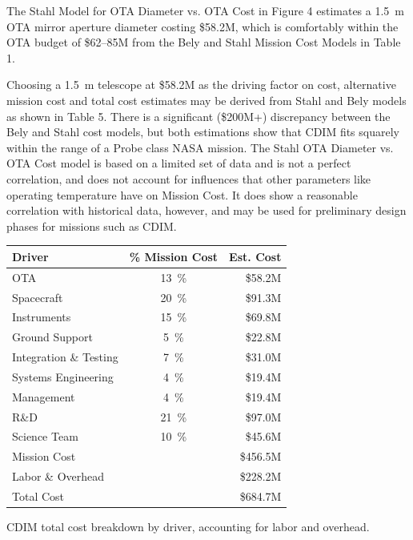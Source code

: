 \documentclass{ws-jai}
\newenvironment{notes}{\color{red}}{}
\begin{document}
\begin{notes}
The Stahl Model for OTA Diameter vs. OTA Cost in Figure 4 estimates a \SI{1.5}{\meter} OTA mirror aperture diameter costing \$58.2M, which is comfortably within the OTA budget of \$62--85M from the Bely and Stahl Mission Cost Models in Table 1.

Choosing a \SI{1.5}{\meter} telescope at \$58.2M as the driving factor on cost, alternative mission cost and total cost estimates may be derived from Stahl and Bely models as shown in Table 5.
There is a significant (\$200M+) discrepancy between the Bely and Stahl cost models, but both estimations show that CDIM fits squarely within the range of a Probe class NASA mission.
The Stahl OTA Diameter vs. OTA Cost model is based on a limited set of data and is not a perfect correlation, and does not account for influences that other parameters like operating temperature have on Mission Cost.
It does show a reasonable correlation with historical data, however, and may be used for preliminary design phases for missions such as CDIM.\@
\end{notes}
\begin{wstable}
  \centering
  \begin{tabular}{@{}lcr@{}}\toprule
    Driver                & \% Mission Cost & Est. Cost \\ \midrule
    OTA                   & \SI{13}{\percent} & \$58.2M \\
    Spacecraft            & \SI{20}{\percent} & \$91.3M \\
    Instruments           & \SI{15}{\percent} & \$69.8M \\
    Ground Support        & \SI{5}{\percent}  & \$22.8M \\
    Integration \& Testing & \SI{7}{\percent} & \$31.0M \\
    Systems Engineering   & \SI{4}{\percent}  & \$19.4M \\
    Management            & \SI{4}{\percent}  & \$19.4M \\
    R\&D                  & \SI{21}{\percent} & \$97.0M \\
    Science Team          & \SI{10}{\percent} & \$45.6M \\ \midrule
    Mission Cost &        & \$456.5M \\
    Labor \& Overhead &   & \$228.2M \\
    Total Cost &          & \$684.7M \\ \bottomrule
  \end{tabular}
  \caption{CDIM total cost breakdown by driver, accounting for labor and overhead.
\label{tab:total-cost}
}
\end{wstable}
\end{document}
